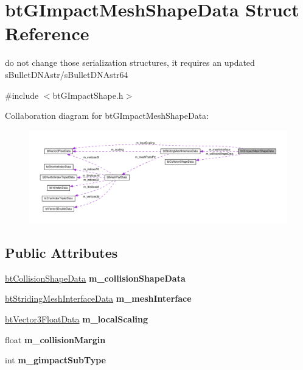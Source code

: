 \hypertarget{structbtGImpactMeshShapeData}{}\section{bt\+G\+Impact\+Mesh\+Shape\+Data Struct Reference}
\label{structbtGImpactMeshShapeData}


do not change those serialization structures, it requires an updated s\+Bullet\+D\+N\+Astr/s\+Bullet\+D\+N\+Astr64  




{\ttfamily \#include $<$bt\+G\+Impact\+Shape.\+h$>$}



Collaboration diagram for bt\+G\+Impact\+Mesh\+Shape\+Data\+:
\nopagebreak
\begin{figure}[H]
\begin{center}
\leavevmode
\includegraphics[width=350pt]{structbtGImpactMeshShapeData__coll__graph}
\end{center}
\end{figure}
\subsection*{Public Attributes}
\begin{DoxyCompactItemize}
\item 
\mbox{\label{structbtGImpactMeshShapeData_a07bd784d15bf2f004ae03ec7fbe33c5a}} 
\hyperlink{structbtCollisionShapeData}{bt\+Collision\+Shape\+Data} {\bfseries m\+\_\+collision\+Shape\+Data}
\item 
\mbox{\label{structbtGImpactMeshShapeData_a635a1bc2cfb2a9c4c73799c4be50df54}} 
\hyperlink{structbtStridingMeshInterfaceData}{bt\+Striding\+Mesh\+Interface\+Data} {\bfseries m\+\_\+mesh\+Interface}
\item 
\mbox{\label{structbtGImpactMeshShapeData_ae8e15246acba144c3383e86b903894ff}} 
\hyperlink{structbtVector3FloatData}{bt\+Vector3\+Float\+Data} {\bfseries m\+\_\+local\+Scaling}
\item 
\mbox{\label{structbtGImpactMeshShapeData_aded76ad490cff87f5f8b51e726b9d221}} 
float {\bfseries m\+\_\+collision\+Margin}
\item 
\mbox{\label{structbtGImpactMeshShapeData_a405b8aa1e0b9a7d46cf9bc1540214820}} 
int {\bfseries m\+\_\+gimpact\+Sub\+Type}
\end{DoxyCompactItemize}


